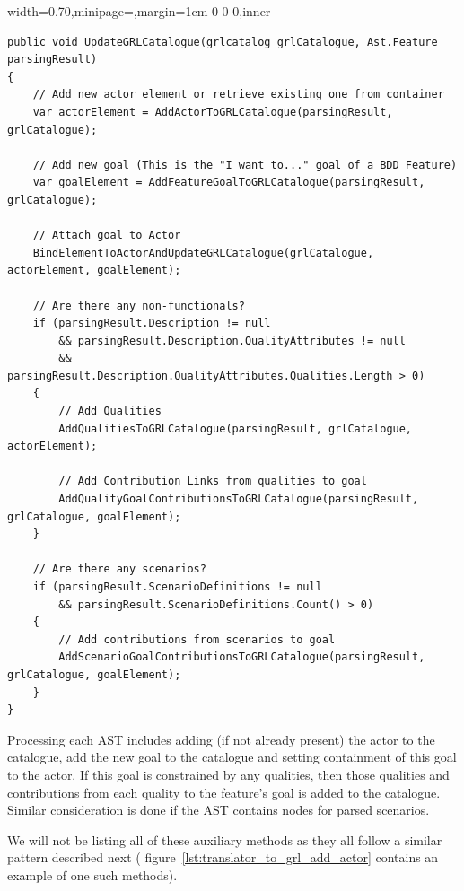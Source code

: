 \documentclass[dissertation,final]{softeng}
\newenvironment{featurecode}[1]
{ \lrbox\featurebox \begin{adjustbox}{width=#1\textwidth,minipage=\textwidth,margin=1cm 0 0 0,inner} }
{ \end{adjustbox}\endlrbox}
\newenvironment{featurelist}[2]
{
\newcommand{\setcaption}{\caption{#1}}
\newcommand{\setlabel}{\label{#2}}
}
{\begin{listing}[h!]\centering\usebox\featurebox\setcaption\setlabel\end{listing}}
\begin{document}
\begin{featurelist}{Translator to GRL -- update catalogue with AST}{lst:translator_to_grl_update_with_AST}
\begin{featurecode}{0.70}
\begin{verbatim}
public void UpdateGRLCatalogue(grlcatalog grlCatalogue, Ast.Feature parsingResult)
{
    // Add new actor element or retrieve existing one from container
    var actorElement = AddActorToGRLCatalogue(parsingResult, grlCatalogue);
    
    // Add new goal (This is the "I want to..." goal of a BDD Feature)
    var goalElement = AddFeatureGoalToGRLCatalogue(parsingResult, grlCatalogue);
    
    // Attach goal to Actor
    BindElementToActorAndUpdateGRLCatalogue(grlCatalogue, actorElement, goalElement);
    
    // Are there any non-functionals?
    if (parsingResult.Description != null 
        && parsingResult.Description.QualityAttributes != null 
        && parsingResult.Description.QualityAttributes.Qualities.Length > 0)
    {
        // Add Qualities
        AddQualitiesToGRLCatalogue(parsingResult, grlCatalogue, actorElement);
    
        // Add Contribution Links from qualities to goal
        AddQualityGoalContributionsToGRLCatalogue(parsingResult, grlCatalogue, goalElement);
    }
    
    // Are there any scenarios?
    if (parsingResult.ScenarioDefinitions != null 
        && parsingResult.ScenarioDefinitions.Count() > 0) 
    {
        // Add contributions from scenarios to goal
        AddScenarioGoalContributionsToGRLCatalogue(parsingResult, grlCatalogue, goalElement);
    }
}
\end{verbatim}
\end{featurecode}
\end{featurelist}

Processing each AST includes adding (if not already present) the actor to the catalogue, add the new goal to the catalogue and setting containment of this goal to the actor. If this goal is constrained by any qualities, then those qualities and contributions from each quality to the feature's goal is added to the catalogue. Similar consideration is done if the AST contains nodes for parsed scenarios. 

We will not be listing all of these auxiliary methods as they all follow a similar pattern described next ( figure~\ref{lst:translator_to_grl_add_actor} contains an example of one such methods).
\end{document}

